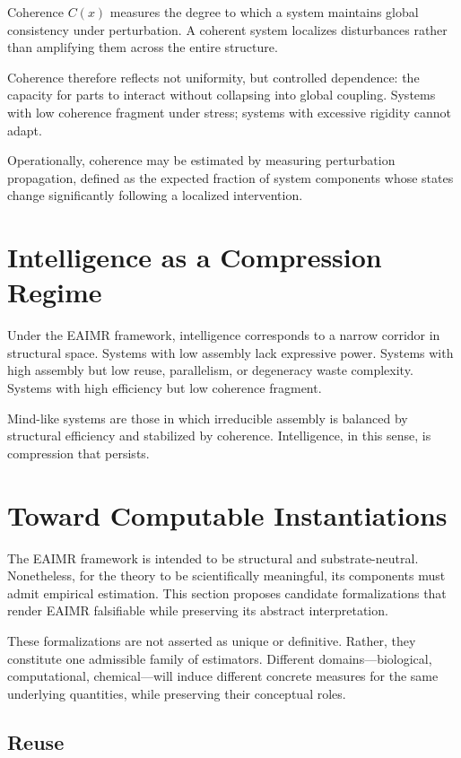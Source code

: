 \documentclass[11pt,letterpaper]{article}
\begin{document}
Coherence $C(x)$ measures the degree to which a system maintains global consistency under perturbation. A coherent system localizes disturbances rather than amplifying them across the entire structure.

Coherence therefore reflects not uniformity, but controlled dependence: the capacity for parts to interact without collapsing into global coupling. Systems with low coherence fragment under stress; systems with excessive rigidity cannot adapt.

Operationally, coherence may be estimated by measuring perturbation propagation, defined as the expected fraction of system components whose states change significantly following a localized intervention.

\section{Intelligence as a Compression Regime}

Under the EAIMR framework, intelligence corresponds to a narrow corridor in structural space. Systems with low assembly lack expressive power. Systems with high assembly but low reuse, parallelism, or degeneracy waste complexity. Systems with high efficiency but low coherence fragment.

Mind-like systems are those in which irreducible assembly is balanced by structural efficiency and stabilized by coherence. Intelligence, in this sense, is compression that persists.

\section{Toward Computable Instantiations}

The EAIMR framework is intended to be structural and substrate-neutral. Nonetheless, for the theory to be scientifically meaningful, its components must admit empirical estimation. This section proposes candidate formalizations that render EAIMR falsifiable while preserving its abstract interpretation.

These formalizations are not asserted as unique or definitive. Rather, they constitute one admissible family of estimators. Different domains—biological, computational, chemical—will induce different concrete measures for the same underlying quantities, while preserving their conceptual roles.

\subsection{Reuse}
\end{document}

